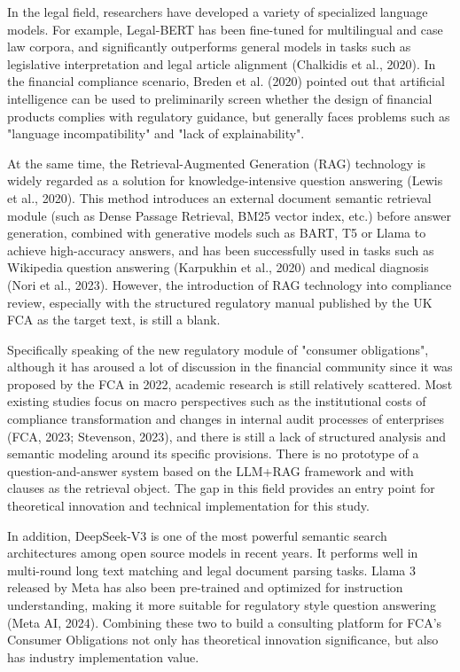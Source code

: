 \documentclass[a4paper,11pt]{article}
\begin{document}
In the legal field, researchers have developed a variety of specialized language models. For example, Legal-BERT has been fine-tuned for multilingual and case law corpora, and significantly outperforms general models in tasks such as legislative interpretation and legal article alignment (Chalkidis et al., 2020). In the financial compliance scenario, Breden et al. (2020) pointed out that artificial intelligence can be used to preliminarily screen whether the design of financial products complies with regulatory guidance, but generally faces problems such as "language incompatibility" and "lack of explainability".

At the same time, the Retrieval-Augmented Generation (RAG) technology is widely regarded as a solution for knowledge-intensive question answering (Lewis et al., 2020). This method introduces an external document semantic retrieval module (such as Dense Passage Retrieval, BM25 vector index, etc.) before answer generation, combined with generative models such as BART, T5 or Llama to achieve high-accuracy answers, and has been successfully used in tasks such as Wikipedia question answering (Karpukhin et al., 2020) and medical diagnosis (Nori et al., 2023). However, the introduction of RAG technology into compliance review, especially with the structured regulatory manual published by the UK FCA as the target text, is still a blank.

Specifically speaking of the new regulatory module of "consumer obligations", although it has aroused a lot of discussion in the financial community since it was proposed by the FCA in 2022, academic research is still relatively scattered. Most existing studies focus on macro perspectives such as the institutional costs of compliance transformation and changes in internal audit processes of enterprises (FCA, 2023; Stevenson, 2023), and there is still a lack of structured analysis and semantic modeling around its specific provisions. There is no prototype of a question-and-answer system based on the LLM+RAG framework and with clauses as the retrieval object. The gap in this field provides an entry point for theoretical innovation and technical implementation for this study.

In addition, DeepSeek-V3 is one of the most powerful semantic search architectures among open source models in recent years. It performs well in multi-round long text matching and legal document parsing tasks. Llama 3 released by Meta has also been pre-trained and optimized for instruction understanding, making it more suitable for regulatory style question answering (Meta AI, 2024). Combining these two to build a consulting platform for FCA's Consumer Obligations not only has theoretical innovation significance, but also has industry implementation value.
\end{document}
